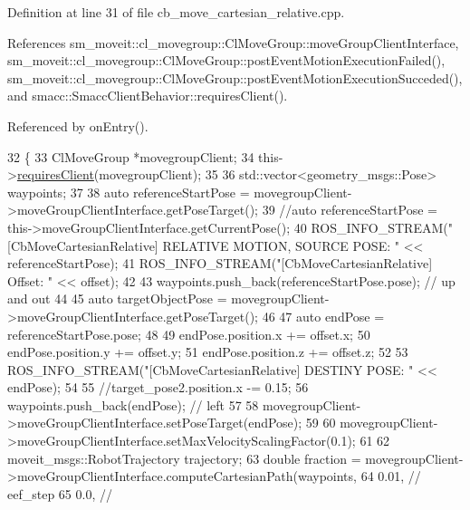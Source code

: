 Definition at line 31 of file cb\+\_\+move\+\_\+cartesian\+\_\+relative.\+cpp.



References sm\+\_\+moveit\+::cl\+\_\+movegroup\+::\+Cl\+Move\+Group\+::move\+Group\+Client\+Interface, sm\+\_\+moveit\+::cl\+\_\+movegroup\+::\+Cl\+Move\+Group\+::post\+Event\+Motion\+Execution\+Failed(), sm\+\_\+moveit\+::cl\+\_\+movegroup\+::\+Cl\+Move\+Group\+::post\+Event\+Motion\+Execution\+Succeded(), and smacc\+::\+Smacc\+Client\+Behavior\+::requires\+Client().



Referenced by on\+Entry().


\begin{DoxyCode}
32 \{
33     ClMoveGroup *movegroupClient;
34     this->\hyperlink{classsmacc_1_1SmaccClientBehavior_a917f001e763a1059af337bf4e164f542}{requiresClient}(movegroupClient);
35 
36     std::vector<geometry\_msgs::Pose> waypoints;
37 
38     \textcolor{keyword}{auto} referenceStartPose = movegroupClient->moveGroupClientInterface.getPoseTarget();
39     \textcolor{comment}{//auto referenceStartPose = this->moveGroupClientInterface.getCurrentPose();}
40     ROS\_INFO\_STREAM(\textcolor{stringliteral}{"[CbMoveCartesianRelative] RELATIVE MOTION, SOURCE POSE: "} << referenceStartPose);
41     ROS\_INFO\_STREAM(\textcolor{stringliteral}{"[CbMoveCartesianRelative] Offset: "} << offset);
42 
43     waypoints.push\_back(referenceStartPose.pose); \textcolor{comment}{// up and out}
44 
45     \textcolor{keyword}{auto} targetObjectPose = movegroupClient->moveGroupClientInterface.getPoseTarget();
46 
47     \textcolor{keyword}{auto} endPose = referenceStartPose.pose;
48 
49     endPose.position.x += offset.x;
50     endPose.position.y += offset.y;
51     endPose.position.z += offset.z;
52 
53     ROS\_INFO\_STREAM(\textcolor{stringliteral}{"[CbMoveCartesianRelative] DESTINY POSE: "} << endPose);
54 
55     \textcolor{comment}{//target\_pose2.position.x -= 0.15;}
56     waypoints.push\_back(endPose); \textcolor{comment}{// left}
57 
58     movegroupClient->moveGroupClientInterface.setPoseTarget(endPose);
59 
60     movegroupClient->moveGroupClientInterface.setMaxVelocityScalingFactor(0.1);
61 
62     moveit\_msgs::RobotTrajectory trajectory;
63     \textcolor{keywordtype}{double} fraction = movegroupClient->moveGroupClientInterface.computeCartesianPath(waypoints,
64                                                                                      0.01, \textcolor{comment}{// eef\_step}
65                                                                                      0.0,  \textcolor{comment}{//
}
\end{DoxyCode}
